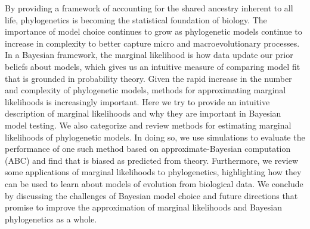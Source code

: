 By providing a framework of accounting for the shared ancestry inherent to all
life,
phylogenetics is becoming the statistical foundation of biology.
The importance of model choice continues to grow as phylogenetic models
continue to increase in complexity to better capture micro and
macroevolutionary processes.
In a Bayesian framework, 
the marginal likelihood is how data update our prior beliefs about models,
which gives us an intuitive measure of comparing model fit that is grounded in
probability theory.
Given the rapid increase in the number and complexity of phylogenetic models,
methods for approximating marginal likelihoods is increasingly important.
Here we try to provide an intuitive description of marginal likelihoods and why
they are important in Bayesian model testing.
We also categorize and review methods for estimating marginal likelihoods of
phylogenetic models.
In doing so, we use simulations to evaluate the performance of one such method
based on approximate-Bayesian computation (ABC) and find that is biased as
predicted from theory.
Furthermore, we review some applications of marginal likelihoods to
phylogenetics, highlighting how they can be used to learn about models of
evolution from biological data.
We conclude by discussing the challenges of Bayesian model choice and future
directions that promise to improve the approximation of marginal likelihoods
and Bayesian phylogenetics as a whole.
